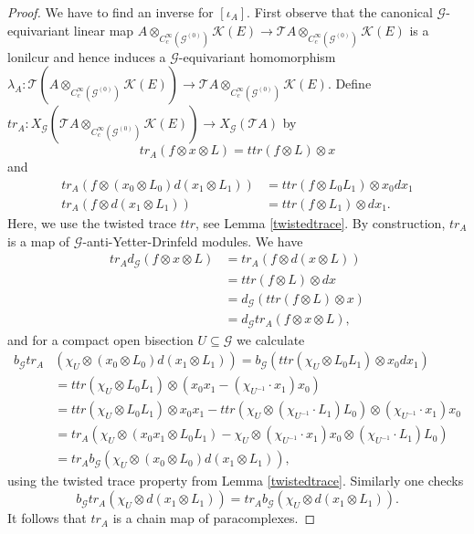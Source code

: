 \documentclass{amsart}
\newcommand{\G}{\mathcal{G}}
\newcommand{\K}{\mathcal{K}}
\newcommand{\T}{\mathcal{T}}
\newcommand{\ccinfty}{C_c^\infty}
\begin{document}
\begin{proof}
We have to find an inverse for $ [\iota_A] $. First observe that the canonical $ \G $-equivariant linear map $ A \otimes_{\ccinfty(\G^{(0)})} \K(E) \rightarrow 
\T A \otimes_{\ccinfty(\G^{(0)})} \K(E) $ is a lonilcur and hence induces 
a $ \G $-equivariant homomorphism $ \lambda_A: \T(A \otimes_{\ccinfty(\G^{(0)})}
\K(E)) \rightarrow \T A \otimes_{\ccinfty(\G^{(0)})} \K(E) $.
Define $ tr_A: X_\G(\T A \otimes_{\ccinfty(\G^{(0)})} \K(E))
\rightarrow X_\G(\T A) $ by
\begin{equation*}
tr_A(f \otimes x \otimes L) = ttr(f \otimes L) \otimes x
\end{equation*}
and
\begin{align*}
tr_A(f \otimes (x_0 \otimes L_0) d(x_1 \otimes L_1)) &= 
ttr(f \otimes L_0 L_1) \otimes x_0 dx_1 \\
tr_A(f \otimes d(x_1 \otimes L_1)) &= 
ttr(f \otimes L_1) \otimes dx_1.
\end{align*}
Here, we use the twisted trace $ ttr $, see Lemma \ref{twistedtrace}. By construction, $ tr_A $ is a map of $ \G $-anti-Yetter-Drinfeld modules. 
We have
\begin{align*}
tr_A d_\G(f \otimes x \otimes L) &= tr_A(f \otimes d(x \otimes L)) \\
&= ttr(f \otimes L) \otimes dx \\
&= d_\G(ttr(f \otimes L) \otimes x) \\
&= d_\G tr_A(f \otimes x \otimes L), 
\end{align*}
and for a compact open bisection $ U \subseteq \G $ we calculate 
\begin{align*}
b_\G tr_A&(\chi_U \otimes (x_0 \otimes L_0) d(x_1\otimes L_1)) = b_\G(ttr(\chi_U \otimes L_0 L_1) \otimes x_0dx_1) \\
&= ttr(\chi_U \otimes L_0 L_1) \otimes (x_0x_1 - (\chi_{U^{-1}}\cdot x_1)x_0) \\
&= ttr(\chi_U \otimes L_0 L_1) \otimes x_0x_1 
- ttr(\chi_U \otimes (\chi_{U^{-1}}\cdot L_1) L_0) \otimes (\chi_{U^{-1}}\cdot x_1)x_0 \\ 
&= tr_A(\chi_U \otimes (x_0x_1\otimes L_0 L_1) - \chi_U \otimes (\chi_{U^{-1}} \cdot x_1)x_0 \otimes (\chi_{U^{-1}}\cdot L_1)L_0) \\
&= tr_A b_\G(\chi_U \otimes (x_0\otimes L_0) d(x_1\otimes L_1)), 
\end{align*}
using the twisted trace property from Lemma \ref{twistedtrace}. Similarly one checks
$$
b_\G tr_A(\chi_U \otimes d(x_1\otimes L_1)) = tr_A b_\G(\chi_U \otimes d(x_1\otimes L_1)). 
$$
It follows that $ tr_A $ is a chain map of paracomplexes. 


\end{proof}
\end{document}
